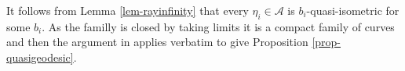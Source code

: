 \documentclass[11pt]{amsart} %
\numberwithin{equation}{section}
\theoremstyle{remark}
\begin{document}
It follows from Lemma \ref{lem-rayinfinity} that every $\eta_i \in \mathcal{A}$ is $b_i$-quasi-isometric for some $b_i$. As the familly is closed by taking limits it is a compact family of curves and then the argument in \cite[Lemma 10.20]{Calegari} applies verbatim to give Proposition \ref{prop-quasigeodesic}. 



%
\bigskip

%
%

%
\end{document}
